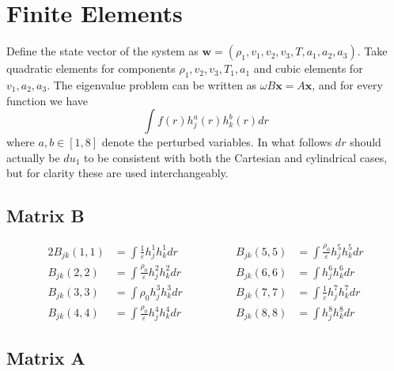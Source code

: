 \documentclass[11pt, fleqn]{article}
\newcommand{\eps}{\varepsilon}
\begin{document}
\section{Finite Elements}
Define the state vector of the system as $\boldsymbol{w} = (\rho_1, v_1, v_2, v_3, T, a_1, a_2, a_3)$. Take quadratic elements for components $\rho_1, v_2, v_3, T_1, a_1$ and cubic elements for $v_1, a_2, a_3$.
The eigenvalue problem can be written as $\omega B \boldsymbol{x} = A \boldsymbol{x}$, and for every function we have
\begin{equation}
	\int f(r) h_j^a(r) h_k^b(r)dr
\end{equation}
where $a, b \in [1, 8]$ denote the perturbed variables. In what follows $dr$ should actually be $du_1$ to be consistent with both the Cartesian and cylindrical cases, but for clarity these are used interchangeably.

\subsection{Matrix B}
\begin{alignat*}{2}
	B_{jk}(1, 1) &= \int \frac{1}{\eps} h_j^1 h_k^1 dr							&\qquad\qquad		B_{jk}(5, 5) &= \int \frac{\rho_0}{\eps} h_j^5 h_k^5 dr			\\
	B_{jk}(2, 2) &= \int \frac{\rho_0}{\eps} h_j^2 h_k^2 dr						&\qquad\qquad		B_{jk}(6, 6) &= \int h_j^6 h_k^6 dr								\\
	B_{jk}(3, 3) &= \int \rho_0 h_j^3 h_k^3 dr								    &\qquad\qquad		B_{jk}(7, 7) &= \int \frac{1}{\eps} h_j^7 h_k^7 dr				\\
	B_{jk}(4, 4) &= \int \frac{\rho_0}{\eps} h_j^4 h_k^4 dr						&\qquad\qquad		B_{jk}(8, 8) &= \int h_j^8 h_k^8 dr
\end{alignat*}


\subsection{Matrix A}
\begingroup
\allowdisplaybreaks
\addtolength{\jot}{10pt}
\end{document}
